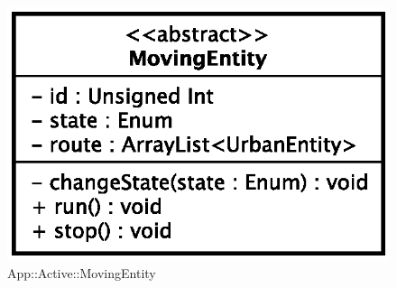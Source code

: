 \begin{figure}[h]
\centering
\includegraphics[scale=0.6,keepaspectratio]{images/solution/moving_entity.eps}
\caption{App::Active::MovingEntity}
\label{fig:sd-app-movingentity}
\end{figure}
\FloatBarrier

